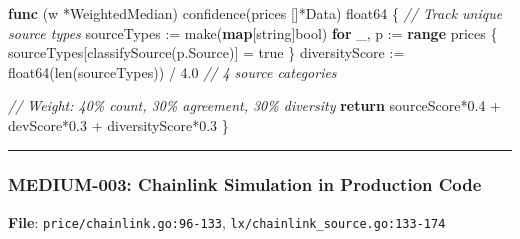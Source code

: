 \documentclass[
]{article}
\newenvironment{Shaded}{}{}
\newcommand{\BuiltInTok}[1]{\textcolor[rgb]{0.00,0.50,0.00}{#1}}
\newcommand{\CommentTok}[1]{\textcolor[rgb]{0.38,0.63,0.69}{\textit{#1}}}
\newcommand{\ControlFlowTok}[1]{\textcolor[rgb]{0.00,0.44,0.13}{\textbf{#1}}}
\newcommand{\DataTypeTok}[1]{\textcolor[rgb]{0.56,0.13,0.00}{#1}}
\newcommand{\FloatTok}[1]{\textcolor[rgb]{0.25,0.63,0.44}{#1}}
\newcommand{\KeywordTok}[1]{\textcolor[rgb]{0.00,0.44,0.13}{\textbf{#1}}}
\newcommand{\NormalTok}[1]{#1}
\newcommand{\OperatorTok}[1]{\textcolor[rgb]{0.40,0.40,0.40}{#1}}
\newcommand{\OtherTok}[1]{\textcolor[rgb]{0.00,0.44,0.13}{#1}}
\begin{document}
\begin{Shaded}
\begin{Highlighting}[]
\KeywordTok{func} \OperatorTok{(}\NormalTok{w }\OperatorTok{*}\NormalTok{WeightedMedian}\OperatorTok{)}\NormalTok{ confidence}\OperatorTok{(}\NormalTok{prices }\OperatorTok{[]*}\NormalTok{Data}\OperatorTok{)} \DataTypeTok{float64} \OperatorTok{\{}
    \CommentTok{// Track unique source types}
\NormalTok{    sourceTypes }\OperatorTok{:=} \BuiltInTok{make}\OperatorTok{(}\KeywordTok{map}\OperatorTok{[}\DataTypeTok{string}\OperatorTok{]}\DataTypeTok{bool}\OperatorTok{)}
    \ControlFlowTok{for}\NormalTok{ \_}\OperatorTok{,}\NormalTok{ p }\OperatorTok{:=} \KeywordTok{range}\NormalTok{ prices }\OperatorTok{\{}
\NormalTok{        sourceTypes}\OperatorTok{[}\NormalTok{classifySource}\OperatorTok{(}\NormalTok{p}\OperatorTok{.}\NormalTok{Source}\OperatorTok{)]} \OperatorTok{=} \OtherTok{true}
    \OperatorTok{\}}
\NormalTok{    diversityScore }\OperatorTok{:=} \DataTypeTok{float64}\OperatorTok{(}\BuiltInTok{len}\OperatorTok{(}\NormalTok{sourceTypes}\OperatorTok{))} \OperatorTok{/} \FloatTok{4.0} \CommentTok{// 4 source categories}
    
    \CommentTok{// Weight: 40\% count, 30\% agreement, 30\% diversity}
    \ControlFlowTok{return}\NormalTok{ sourceScore}\OperatorTok{*}\FloatTok{0.4} \OperatorTok{+}\NormalTok{ devScore}\OperatorTok{*}\FloatTok{0.3} \OperatorTok{+}\NormalTok{ diversityScore}\OperatorTok{*}\FloatTok{0.3}
\OperatorTok{\}}
\end{Highlighting}
\end{Shaded}

\begin{center}\rule{0.5\linewidth}{0.5pt}\end{center}

\subsubsection{MEDIUM-003: Chainlink Simulation in Production
Code}\label{medium-003-chainlink-simulation-in-production-code}

\textbf{File}: \texttt{price/chainlink.go:96-133},
\texttt{lx/chainlink\_source.go:133-174}
\end{document}
